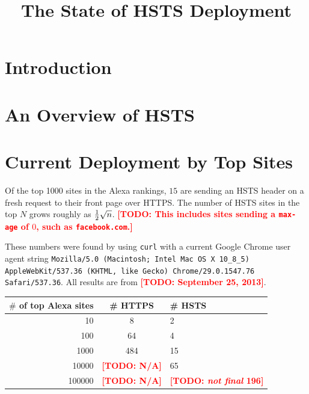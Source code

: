 \documentclass[conference]{./IEEEtran}
\newcommand{\todo}[1]{\textcolor{red}{\textbf{[TODO: #1]}}}
\newcommand{\td}[2]{\textcolor{red}{\textbf{[TODO: {\it{#1}} #2]}}}
\newcommand{\code}[1]{\texttt{#1}}
\newcommand{\site}[1]{\texttt{#1}}
\theoremstyle{plain}
\begin{document}
\title{The State of HSTS Deployment}

\author{}


\maketitle

\thispagestyle{fancy}

\begin{abstract}

\end{abstract}

\section{Introduction}
\label{sec:intro}

\section{An Overview of HSTS}

\section{Current Deployment by Top Sites}

Of the top 1000 sites in the Alexa rankings, $15$ are sending an HSTS header on a fresh request to their front page over HTTPS. The number of HSTS sites in the top $N$ grows roughly as ${1 \over 2}\sqrt{n}$. \todo{This includes sites sending a \code{max-age} of $0$, such as \site{facebook.com}.}

These numbers were found by using \code{curl} with a current Google Chrome user agent string \code{Mozilla/5.0 (Macintosh; Intel Mac OS X 10\_8\_5) AppleWebKit/537.36 (KHTML, like Gecko) Chrome/29.0.1547.76 Safari/537.36}. All results are from \todo{September 25, 2013}.

\begin{table}[htdp]
\label{alexa_table}
\begin{center}
\begin{tabular}{|r|c|l|}
\hline
$\#$ of top Alexa sites & \# HTTPS & \# HSTS\\
\hline
10 & 8 & 2 \\
\hline
100 & 64 & 4 \\	
\hline
1000 & 484 &15 \\
\hline
10000 & \todo{N/A} & 65\\
\hline
100000 & \todo{N/A} & \td{not final}{196}\\
\hline
\end{tabular}
\end{center}
\end{table}%
\end{document}
